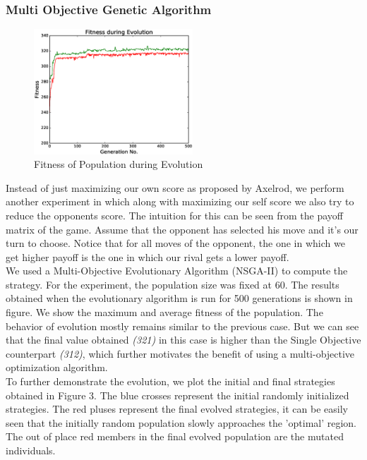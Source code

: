 \documentclass[a4paper]{article}
\begin{document}
	\subsubsection{Multi Objective Genetic Algorithm}
		
	\begin{figure}
	\centering
	\includegraphics[width=0.53\textwidth]{multFitPlot.eps}
	\caption{\footnotesize{Fitness of Population during Evolution}}
	\end{figure}
	Instead of just maximizing our own score as proposed by Axelrod, we perform another experiment in which along with maximizing our self score we also try to reduce the opponents score. The intuition for this can be seen from the payoff matrix of the game. Assume that the opponent has selected his move and it's our turn to choose. Notice that for all moves of the opponent, the one in which we get higher payoff is the one in which our rival gets a lower payoff.\\
	We used a Multi-Objective Evolutionary Algorithm (NSGA-II) to compute the strategy. For the experiment, the population size was fixed at 60. The results obtained when the evolutionary algorithm is run for 500 generations is shown in figure. We show the maximum and average fitness of the population. The behavior of evolution mostly remains similar to the previous case. But we can see that the final value obtained \textit{(321)} in this case is higher than the Single Objective counterpart \textit{(312)}, which further motivates the benefit of using a multi-objective optimization algorithm.\\

	To further demonstrate the evolution, we plot the initial and final strategies obtained in Figure 3. The blue crosses represent the initial randomly initialized strategies. The red pluses represent the final evolved strategies, it can be easily seen that the initially random population slowly approaches the 'optimal' region. The out of place red members in the final evolved population are the mutated individuals.
\end{document}
